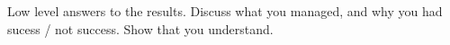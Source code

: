 Low level answers to the results. 
Discuss what you managed, and why you had sucess / not success. 
Show that you understand.

